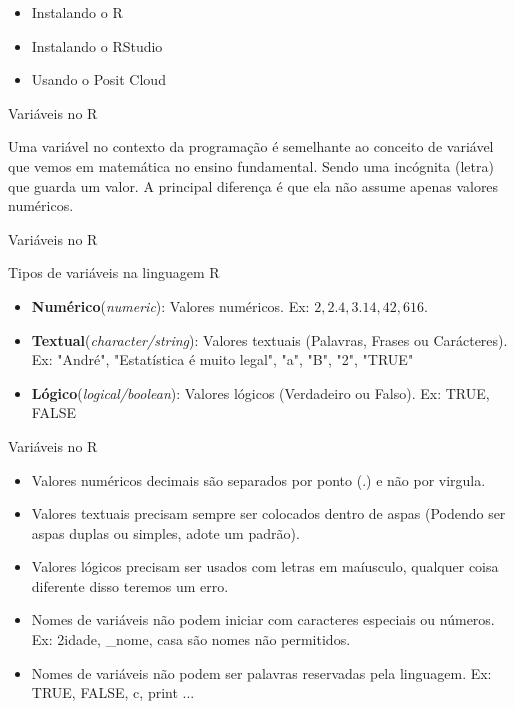 \documentclass{beamer}
\begin{document}
\begin{frame}
  \begin{itemize}
    \item Instalando o R
    \item Instalando o RStudio
    \item Usando o Posit Cloud
  \end{itemize}
\end{frame}

\begin{frame}{Variáveis no R}
  \begin{definicao}
  Uma variável no contexto da programação é semelhante ao conceito de variável que vemos em matemática no ensino fundamental.
  Sendo uma incógnita (letra) que guarda um valor. A principal diferença é que ela não assume apenas valores numéricos. 
  \end{definicao}
  
\end{frame}

\begin{frame}{Variáveis no R}
 
  {\color{gray}\large Tipos de variáveis na linguagem R}
 \vspace{0.4cm} %
  \begin{itemize}
    \item \textbf{Numérico}(\textit{numeric}): Valores numéricos. Ex: $2, 2.4, 3.14, 42, 616$.
    \item \textbf{Textual}(\textit{character/string}): Valores textuais (Palavras, Frases ou Carácteres). Ex: "André", "Estatística é muito legal", "a", "B", "2", "TRUE"
    \item \textbf{Lógico}(\textit{logical/boolean}): Valores lógicos (Verdadeiro ou Falso). Ex: TRUE, FALSE
  \end{itemize}
\end{frame}

\begin{frame}{Variáveis no R}
\begin{atencao}
\begin{itemize}
  \item Valores numéricos decimais são separados por ponto (.) e não por virgula. 
  \item Valores textuais precisam sempre ser colocados dentro de aspas (Podendo ser aspas duplas ou simples, adote um padrão).
  \item Valores lógicos precisam ser usados com letras em maíusculo, qualquer coisa diferente disso teremos um erro. 
  \item Nomes de variáveis não podem iniciar com caracteres especiais ou números. Ex: 2idade, \_nome, \*casa são nomes não permitidos. 
  \item Nomes de variáveis não podem ser palavras reservadas pela linguagem. Ex: TRUE, FALSE, c, print ...
\end{itemize}
\end{atencao}
\end{frame}
\end{document}
